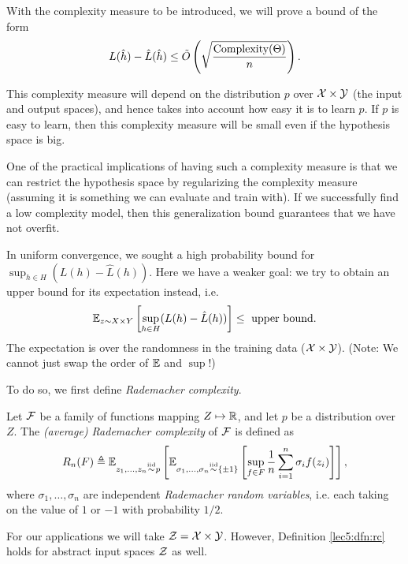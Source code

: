 With the complexity measure to be introduced, we will prove a bound of the form
\begin{align}
    L(\hat h) - \hat L(\hat h) \leq \tilde O\left(\sqrt{\frac{\text{Complexity}(\Theta)}{n}}\right).
\end{align}

This complexity measure will depend on the distribution $p$ over $\mathcal X \times \mathcal Y$ (the input and output spaces), and hence takes into account how easy it is to learn $p$. If $p$ is easy to learn, then this complexity measure will be small even if the hypothesis space is big.

One of the practical implications of having such a complexity measure is that we can restrict the hypothesis space by regularizing the complexity measure (assuming it is something we can evaluate and train with). If we successfully find a low complexity model, then this generalization bound guarantees that we have not overfit.


In uniform convergence, we sought a high probability bound for $\sup_{h \in H}(L(h) - \hat L (h))$. Here we have a weaker goal: we try to obtain an upper bound for its expectation instead, i.e.
\begin{equation}
\mathbb E_{z \sim X \times Y}\left[ \sup_{h \in H}(L(h) - \hat L (h)) \right] \leq \text{ upper bound}.
\end{equation}
The expectation is over the randomness in the training data ($\mathcal X \times \mathcal Y$). (Note: We cannot just swap the order of $\mathbb E$ and $\sup$!)

To do so, we first define \textit{Rademacher complexity}.

\begin{definition} \label{lec5:dfn:rc}
Let $\mathcal F$ be a family of functions mapping $Z \mapsto \mathbb R$, and let $p$ be a distribution over $Z$. The \textit{(average) Rademacher complexity} of $\mathcal F$ is defined as 
\begin{align}
    R_n(F) \triangleq {\mathbb E}_{z_1, \dots, z_n \overset{\textup{iid}}{\sim} p} \left[ 
    {\mathbb E}_{\sigma_1, \dots, \sigma_n \overset{\textup{iid}}{\sim}\{ \pm 1 \}} \left[ \sup_{f\in F} \frac{1}{n} \sum^n_{i=1} \sigma_i f(z_i) \right] \right], \label{lec5:eqn:Rn}
\end{align}
where $\sigma_1, \dots, \sigma_n$ are independent \textit{Rademacher random variables}, i.e. each taking on the value of $1$ or $-1$ with probability $1/2$.
\end{definition}

\begin{remark}
For our applications we will take $\mathcal Z = \mathcal X \times \mathcal Y$. However, Definition \ref{lec5:dfn:rc} holds for abstract input spaces $\mathcal Z$ as well.
\end{remark}

